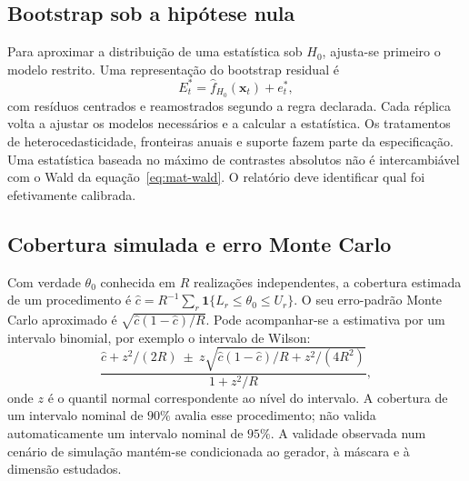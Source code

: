 \subsection{Bootstrap sob a hipótese nula}
\label{sec:mat-bootstrap-nulo}
Para aproximar a distribuição de uma estatística sob $H_0$, ajusta-se primeiro o modelo restrito. Uma representação do bootstrap residual é
\begin{equation}
E_t^*=\widehat f_{H_0}(\boldsymbol x_t)+e_t^*,
\label{eq:mat-bootstrap-nulo}
\end{equation}
com resíduos centrados e reamostrados segundo a regra declarada. Cada réplica volta a ajustar os modelos necessários e a calcular a estatística. Os tratamentos de heterocedasticidade, fronteiras anuais e suporte fazem parte da especificação. Uma estatística baseada no máximo de contrastes absolutos não é intercambiável com o Wald da equação~\ref{eq:mat-wald}. O relatório deve identificar qual foi efetivamente calibrada.


\subsection{Cobertura simulada e erro Monte Carlo}
\label{sec:mat-cobertura-mc}
Com verdade $\theta_0$ conhecida em $R$ realizações independentes, a cobertura estimada de um procedimento é $\widehat c=R^{-1}\sum_r\mathbf1\{L_r\leq\theta_0\leq U_r\}$. O seu erro-padrão Monte Carlo aproximado é $\sqrt{\widehat c(1-\widehat c)/R}$. Pode acompanhar-se a estimativa por um intervalo binomial, por exemplo o intervalo de Wilson\parencite{Wilson1927}:
\begin{equation}
\frac{\widehat c+z^2/(2R)\ \pm\ z\sqrt{\widehat c(1-\widehat c)/R+z^2/(4R^2)}}{1+z^2/R},
\label{eq:mat-wilson}
\end{equation}
onde $z$ é o quantil normal correspondente ao nível do intervalo. A cobertura de um intervalo nominal de $90\%$ avalia esse procedimento; não valida automaticamente um intervalo nominal de $95\%$. A validade observada num cenário de simulação mantém-se condicionada ao gerador, à máscara e à dimensão estudados.

